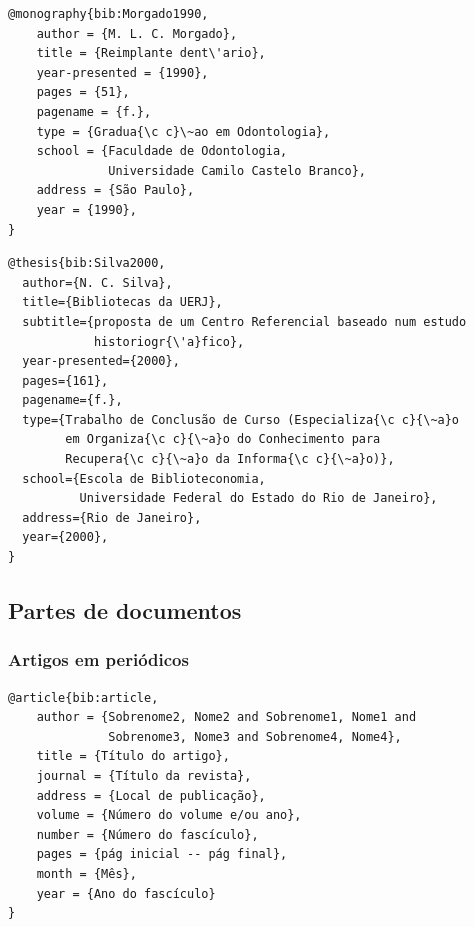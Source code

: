 \documentclass[a4paper,12pt,oneside,onecolumn,final,fleqn]{repUERJ}
\begin{document}
\noindent{}

\begin{verbatim}
@monography{bib:Morgado1990,
    author = {M. L. C. Morgado},
    title = {Reimplante dent\'ario},
    year-presented = {1990},
    pages = {51},
    pagename = {f.},
    type = {Gradua{\c c}\~ao em Odontologia},
    school = {Faculdade de Odontologia, 
              Universidade Camilo Castelo Branco},
    address = {São Paulo},
    year = {1990},
}
\end{verbatim}

\noindent{}

\begin{verbatim}
@thesis{bib:Silva2000,
  author={N. C. Silva},
  title={Bibliotecas da UERJ},
  subtitle={proposta de um Centro Referencial baseado num estudo
            historiogr{\'a}fico},
  year-presented={2000},
  pages={161},
  pagename={f.},
  type={Trabalho de Conclusão de Curso (Especializa{\c c}{\~a}o
        em Organiza{\c c}{\~a}o do Conhecimento para 
        Recupera{\c c}{\~a}o da Informa{\c c}{\~a}o)},
  school={Escola de Biblioteconomia, 
          Universidade Federal do Estado do Rio de Janeiro},
  address={Rio de Janeiro},
  year={2000},
}
\end{verbatim}

\subsection{Partes de documentos}

\subsubsection{Artigos em periódicos}

\noindent{}

\begin{verbatim}
@article{bib:article,
    author = {Sobrenome2, Nome2 and Sobrenome1, Nome1 and
              Sobrenome3, Nome3 and Sobrenome4, Nome4},
    title = {Título do artigo},
    journal = {Título da revista},
    address = {Local de publicação},
    volume = {Número do volume e/ou ano},
    number = {Número do fascículo},
    pages = {pág inicial -- pág final},
    month = {Mês},
    year = {Ano do fascículo}
}
\end{verbatim}
\end{document}
